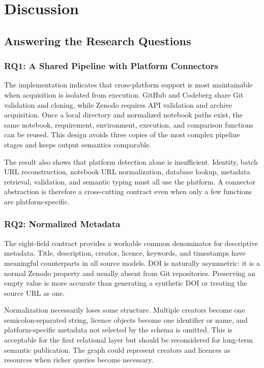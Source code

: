 \chapter{Discussion}
\label{chap:discussion}

\section{Answering the Research Questions}

\subsection{RQ1: A Shared Pipeline with Platform Connectors}

The implementation indicates that cross-platform support is most maintainable when acquisition is isolated from execution. GitHub and Codeberg share Git validation and cloning, while Zenodo requires API validation and archive acquisition. Once a local directory and normalized notebook paths exist, the same notebook, requirement, environment, execution, and comparison functions can be reused. This design avoids three copies of the most complex pipeline stages and keeps output semantics comparable.

The result also shows that platform detection alone is insufficient. Identity, batch URL reconstruction, notebook URL normalization, database lookup, metadata retrieval, validation, and semantic typing must all use the platform. A connector abstraction is therefore a cross-cutting contract even when only a few functions are platform-specific.

\subsection{RQ2: Normalized Metadata}

The eight-field contract provides a workable common denominator for descriptive metadata. Title, description, creator, licence, keywords, and timestamps have meaningful counterparts in all source models. DOI is naturally asymmetric: it is a normal Zenodo property and usually absent from Git repositories. Preserving an empty value is more accurate than generating a synthetic DOI or treating the source URL as one.

Normalization necessarily loses some structure. Multiple creators become one semicolon-separated string, licence objects become one identifier or name, and platform-specific metadata not selected by the schema is omitted. This is acceptable for the first relational layer but should be reconsidered for long-term semantic publication. The graph could represent creators and licences as resources when richer queries become necessary.

